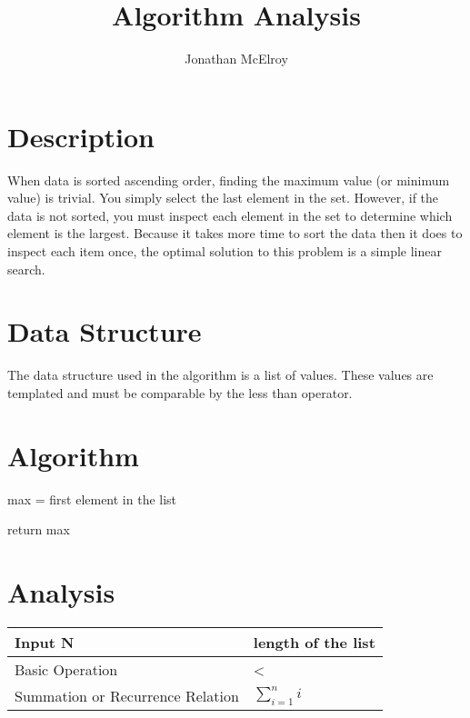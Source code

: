 \documentclass[12pt,letterpaper,oneside]{article}
\author{Jonathan McElroy}
\title{Algorithm Analysis}
\begin{document}

\maketitle

\section*{Description} %

When data is sorted ascending order, finding the maximum value (or minimum value) is trivial. You simply select the last element in the set. However, if the data is not sorted, you must inspect each element in the set to determine which element is the largest. Because it takes more time to sort the data then it does to inspect each item once, the optimal solution to this problem is a simple linear search.

\section*{Data Structure} %

The data structure used in the algorithm is a list of values. These values are templated and must be comparable by the less than operator.

\section*{Algorithm} %

\begin{algorithm}[h]
max = first element in the list

return max
\end{algorithm}

\section*{Analysis}
\begin{tabular}{|l|l|}
\hline
Input N& length of the list \\ \hline %
Basic Operation& \textless \\ \hline %
Summation or Recurrence Relation& \( \displaystyle\sum\limits_{i=1}^n i \) \\ \hline %
\end{tabular}
\end{document}
